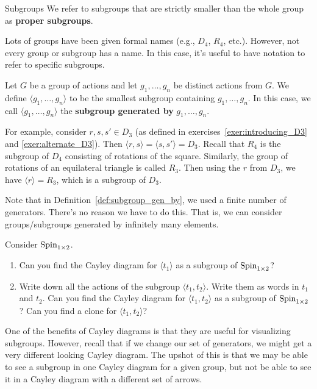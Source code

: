 \begin{section}{Subgroups}
We refer to subgroups that are strictly smaller than the whole group as \textbf{proper subgroups}.

Lots of groups have been given formal names (e.g., $D_4$, $R_4$, etc.).  However, not every group or subgroup has a name.  In this case, it's useful to have notation to refer to specific subgroups.

\begin{definition}\label{def:subgroup_gen_by}
Let $G$ be a group of actions and let $g_1,\ldots, g_n$ be distinct actions from $G$.  We define $\langle g_1,\ldots, g_n\rangle$ to be the smallest subgroup containing $g_1,\ldots, g_n$.  In this case, we call $\langle g_1,\ldots, g_n\rangle$ the \textbf{subgroup generated by} $g_1,\ldots, g_n$.
\end{definition}

For example, consider $r, s, s'\in D_3$ (as defined in exercises~\ref{exer:introducing_D3} and \ref{exer:alternate_D3}).  Then $\langle r,s\rangle=\langle s, s'\rangle=D_3$.  Recall that $R_4$ is the subgroup of $D_4$ consisting of rotations of the square.  Similarly, the group of rotations of an equilateral triangle is called $R_3$.  Then using the $r$ from $D_3$, we have $\langle r\rangle = R_3$, which is a subgroup of $D_3$.

Note that in Definition~\ref{def:subgroup_gen_by}, we used a finite number of generators.  There's no reason we have to do this.  That is, we can consider groups/subgroups generated by infinitely many elements.

\begin{exercise}
Consider $\operatorname{Spin}_{1\times 2}$.  
\begin{enumerate}[label=\rm{(\alph*)}]
\item Can you find the Cayley diagram for $\langle t_1\rangle$ as a subgroup of $\operatorname{Spin}_{1\times 2}$?
\item Write down all the actions of the subgroup $\langle t_1, t_2\rangle$. Write them as words in $t_1$ and $t_2$.  Can you find the Cayley diagram for $\langle t_1, t_2\rangle$ as a subgroup of $\operatorname{Spin}_{1\times 2}$?  Can you find a clone for $\langle t_1, t_2\rangle$?
\end{enumerate}
\end{exercise}

One of the benefits of Cayley diagrams is that they are useful for visualizing subgroups.  However, recall that if we change our set of generators, we might get a very different looking Cayley diagram.  The upshot of this is that we may be able to see a subgroup in one Cayley diagram for a given group, but not be able to see it in a Cayley diagram with a different set of arrows.


\end{section}
